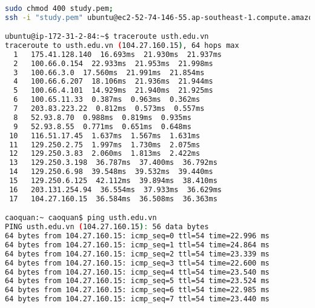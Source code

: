 \documentclass{article}
\begin{document}
\newpage

\begin{lstlisting}[language=Bash]

sudo chmod 400 study.pem;
ssh -i "study.pem" ubuntu@ec2-52-74-146-55.ap-southeast-1.compute.amazonaws.com

ubuntu@ip-172-31-2-84:~$ traceroute usth.edu.vn
traceroute to usth.edu.vn (104.27.160.15), 64 hops max
  1   175.41.128.140  16.693ms  21.930ms  21.937ms 
  2   100.66.0.154  22.933ms  21.953ms  21.998ms 
  3   100.66.3.0  17.560ms  21.991ms  21.854ms 
  4   100.66.6.207  18.106ms  21.936ms  21.944ms 
  5   100.66.4.101  14.929ms  21.940ms  21.925ms 
  6   100.65.11.33  0.387ms  0.963ms  0.362ms 
  7   203.83.223.22  0.812ms  0.573ms  0.557ms 
  8   52.93.8.70  0.988ms  0.819ms  0.935ms 
  9   52.93.8.55  0.771ms  0.651ms  0.648ms 
 10   116.51.17.45  1.637ms  1.567ms  1.631ms 
 11   129.250.2.75  1.997ms  1.730ms  2.075ms 
 12   129.250.3.83  2.060ms  1.813ms  2.422ms 
 13   129.250.3.198  36.787ms  37.400ms  36.792ms 
 14   129.250.6.98  39.548ms  39.532ms  39.440ms 
 15   129.250.6.125  42.112ms  39.894ms  38.410ms 
 16   203.131.254.94  36.554ms  37.933ms  36.629ms 
 17   104.27.160.15  36.584ms  36.508ms  36.363ms 

caoquan:~ caoquan$ ping usth.edu.vn
PING usth.edu.vn (104.27.160.15): 56 data bytes
64 bytes from 104.27.160.15: icmp_seq=0 ttl=54 time=22.996 ms
64 bytes from 104.27.160.15: icmp_seq=1 ttl=54 time=24.864 ms
64 bytes from 104.27.160.15: icmp_seq=2 ttl=54 time=23.339 ms
64 bytes from 104.27.160.15: icmp_seq=3 ttl=54 time=22.600 ms
64 bytes from 104.27.160.15: icmp_seq=4 ttl=54 time=23.540 ms
64 bytes from 104.27.160.15: icmp_seq=5 ttl=54 time=23.524 ms
64 bytes from 104.27.160.15: icmp_seq=6 ttl=54 time=22.985 ms
64 bytes from 104.27.160.15: icmp_seq=7 ttl=54 time=23.440 ms

\end{lstlisting}




\end{document}
